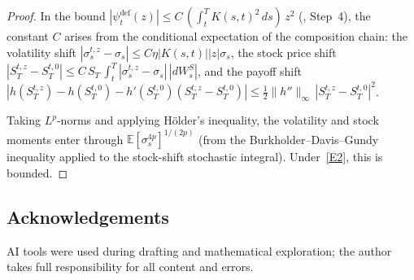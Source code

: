 \documentclass[11pt,a4paper]{article}
\theoremstyle{plain}
\theoremstyle{definition}
\theoremstyle{remark}
\newcommand{\E}{\mathbb{E}}
\begin{document}
\begin{proof}
In the bound $|\psi_t^{\mathrm{def}}(z)| \leq
C\,(\int_t^T K(s,t)^2\,ds)\,z^2$
(, Step~4),
the constant $C$ arises from the conditional expectation
of the composition chain: the volatility shift
$|\sigma_s^{t,z} - \sigma_s| \leq C\eta|K(s,t)||z|\sigma_s$,
the stock price shift
$|S_T^{t,z} - S_T^{t,0}| \leq C\,S_T\,
\int_t^T|\sigma_s^{t,z} - \sigma_s|\,|dW_s^S|$, and
the payoff shift $|h(S_T^{t,z}) - h(S_T^{t,0})
- h'(S_T^{t,0})(S_T^{t,z} - S_T^{t,0})|
\leq \frac{1}{2}\|h''\|_\infty\,|S_T^{t,z} - S_T^{t,0}|^2$.

Taking $L^p$-norms and applying H\"older's inequality,
the volatility and stock moments enter through
$\E[\sigma_s^{4p}]^{1/(2p)}$ (from the Burkholder--Davis--Gundy
inequality applied to the stock-shift stochastic integral).
Under~\ref{E2}, this is bounded.
\end{proof}



\subsection*{Acknowledgements}

AI tools were used during drafting and mathematical exploration;
the author takes full responsibility for all content and errors.


\end{document}
